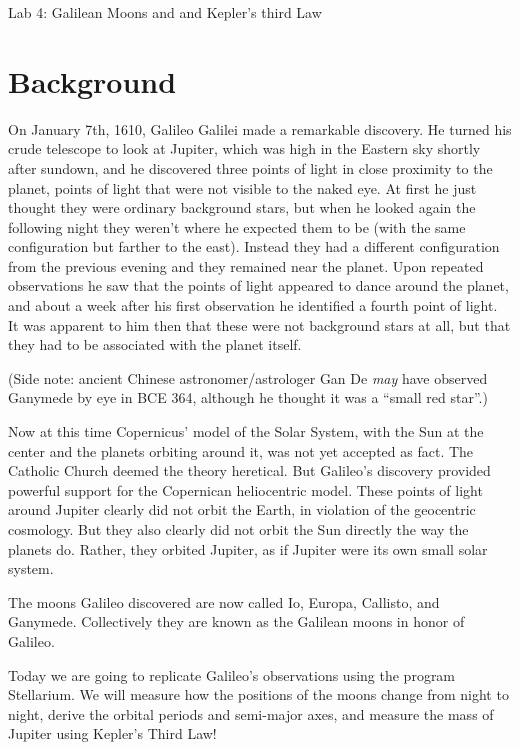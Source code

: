\documentclass[12pt]{article}%
\begin{document}
\begin{center}
    \LARGE Lab 4: Galilean Moons and and Kepler's third Law
\end{center}

\section*{Background}
On January 7th, 1610, Galileo Galilei made a remarkable discovery. He turned his crude telescope to look at Jupiter, which was high in the Eastern sky shortly after sundown, and he discovered three points of light in close proximity to the planet, points of light that were not visible to the naked eye. At first he just thought they were ordinary background stars, but when he looked again the following night they weren't where he expected them to be (with the same configuration but farther to the east). Instead they had a different configuration from the previous evening and they remained near the planet. Upon repeated observations he saw that the points of light appeared to dance around the planet, and about a week after his first observation he identified a fourth point of light. It was apparent to him then that these were not background stars at all, but that they had to be associated with the planet itself.

(Side note: ancient Chinese astronomer/astrologer Gan De \emph{may} have observed Ganymede by eye in BCE 364, although he thought it was a ``small red star''.)

Now at this time Copernicus' model of the Solar System, with the Sun at the center and the planets orbiting around it, was not yet accepted as fact. The Catholic Church deemed the theory heretical. But Galileo's discovery provided powerful support for the Copernican heliocentric model. These points of light around Jupiter clearly did not orbit the Earth, in violation of the geocentric cosmology. But they also clearly did not orbit the Sun directly the way the planets do. Rather, they orbited Jupiter, as if Jupiter were its own small solar system.

The moons Galileo discovered are now called Io, Europa, Callisto, and Ganymede. Collectively they are known as the Galilean moons in honor of Galileo.

Today we are going to replicate Galileo's observations using the program Stellarium. We will measure how the positions of the moons change from night to night, derive the orbital periods and semi-major axes, and measure the mass of Jupiter using Kepler's Third Law! 
\end{document}
